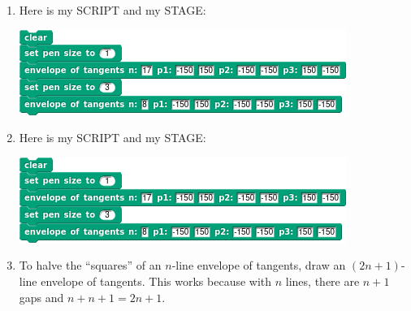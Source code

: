 \documentclass[noauthor,nooutcomes,12pt,hints,handout]{ximera}
\begin{document}
\begin{question}
\begin{freeResponse}
    \begin{enumerate}
    \item Here is my SCRIPT and my STAGE:
      \begin{center}
        \includegraphics[width=.3\textwidth]{8-17-lineOfTanScript.png}\qquad{}
      \end{center}
    \item Here is my SCRIPT and my STAGE:
      \begin{center}
        \includegraphics[width=.3\textwidth]{8-17-lineOfTanScript.png}\qquad{}
      \end{center}
    \item To halve the ``squares'' of an $n$-line envelope of
      tangents, draw an $(2n+1)$-line envelope of tangents. This works
      because with $n$ lines, there are $n+1$ gaps and $n + n+1 =
      2n+1$.
    \end{enumerate}
  \end{freeResponse}
\end{question}

\mynewpage
\end{document}
